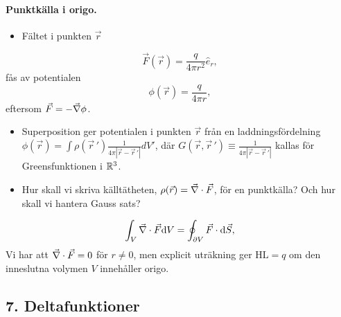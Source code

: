 \documentclass[%
oneside,                 %
final,                   %
10pt]{article}
\newenvironment{summary_mdfboxadmon}[1][]{
\begin{summary_mdfboxmdframed}[frametitle=#1]
}
{
\end{summary_mdfboxmdframed}
}
\begin{document}
\begin{summary_mdfboxadmon}

\paragraph{Punktkälla i origo.}
\begin{itemize}
\item Fältet i punkten $\vec{r}$
\end{itemize}

\noindent
\begin{equation}
  \vec{F}(\vec{r}) = \frac{q}{4 \pi r^2} \hat{e}_r,
\end{equation}
fås av potentialen
\begin{equation}
  \phi(\vec{r}) = \frac{q}{4 \pi r},
\end{equation}
eftersom $\vec{F} = - \vec{\nabla} \phi$.

\begin{itemize}
\item Superposition ger potentialen i punkten $\vec{r}$ från en laddningsfördelning $\phi(\vec{r}) = \int \rho(\vec{r}\,') \frac{1}{4\pi|\vec{r} - \vec{r}\,'|} dV'$, där $G(\vec{r}, \vec{r}\,') \equiv \frac{1}{4\pi|\vec{r} - \vec{r}\,'|}$ kallas för Greensfunktionen i $\Bbb{R}^3$.

\item Hur skall vi skriva källtätheten, $\rho (\vec{r}) = \vec{\nabla} \cdot \vec{F}$, för en punktkälla? Och hur skall vi hantera Gauss sats?
\end{itemize}

\noindent
\begin{equation}
  \int_V \vec{\nabla} \cdot \vec{F} \mbox{d}V = \oint_{\partial V} \vec{F} \cdot \mbox{d} \vec{S},
\end{equation}
Vi har att $\vec{\nabla} \cdot \vec{F} = 0$ för $ r \neq 0 $,
men explicit uträkning ger $\mathrm{HL} = q$ om den inneslutna volymen $V$ innehåller origo.
\end{summary_mdfboxadmon} %



\subsection*{7. Deltafunktioner}
\end{document}

